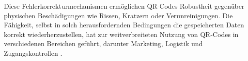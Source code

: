 Diese Fehlerkorrekturmechanismen ermöglichen QR-Codes Robustheit gegenüber physischen Beschädigungen wie Rissen, Kratzern oder Verunreinigungen. Die Fähigkeit, selbst in solch herausfordernden Bedingungen die gespeicherten Daten korrekt wiederherzustellen, hat zur weitverbreiteten Nutzung von QR-Codes in verschiedenen Bereichen geführt, darunter Marketing, Logistik und Zugangskontrollen \cite{QRCode2024}.